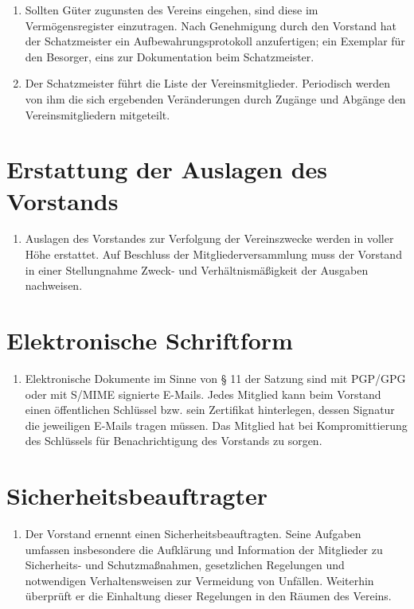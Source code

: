 \documentclass[fontsize=12pt,paper=a4,pagesize,headings=small]{scrartcl}
\begin{document}
\begin{enumerate}
    \item Sollten Güter zugunsten des Vereins eingehen, sind diese im
        Vermögensregister einzutragen. Nach Genehmigung durch den Vorstand hat
        der Schatzmeister ein Aufbewahrungsprotokoll anzufertigen; ein Exemplar
        für den Besorger, eins zur Dokumentation beim Schatzmeister.

    \item Der Schatzmeister führt die Liste der Vereinsmitglieder.
        Periodisch werden von ihm die sich ergebenden Veränderungen durch
        Zugänge und Abgänge den Vereinsmitgliedern mitgeteilt.
\end{enumerate}

\section{Erstattung der Auslagen des Vorstands}
\begin{enumerate}
    \item Auslagen des Vorstandes zur Verfolgung der Vereinszwecke werden
        in voller Höhe erstattet. Auf Beschluss der Mitgliederversammlung
        muss der Vorstand in einer Stellungnahme Zweck- und
        Verhältnismäßigkeit der Ausgaben nachweisen.
\end{enumerate}


\section{Elektronische Schriftform}
\begin{enumerate}
    \item Elektronische Dokumente im Sinne von § 11 der Satzung sind mit
        PGP/GPG oder mit S/MIME signierte E-Mails. Jedes Mitglied kann beim
        Vorstand einen öffentlichen Schlüssel bzw. sein Zertifikat
        hinterlegen, dessen Signatur die jeweiligen E-Mails tragen müssen.
        Das Mitglied hat bei Kompromittierung des Schlüssels für
        Benachrichtigung des Vorstands zu sorgen.
\end{enumerate}


\section{Sicherheitsbeauftragter}
\begin{enumerate}
    \item Der Vorstand ernennt einen Sicherheitsbeauftragten. Seine
        Aufgaben umfassen insbesondere die Aufklärung und Information der
        Mitglieder zu Sicherheits- und Schutzmaßnahmen, gesetzlichen
        Regelungen und notwendigen Verhaltensweisen zur Vermeidung von
        Unfällen. Weiterhin überprüft er die Einhaltung dieser Regelungen in
        den Räumen des Vereins.
\end{enumerate}
\end{document}
